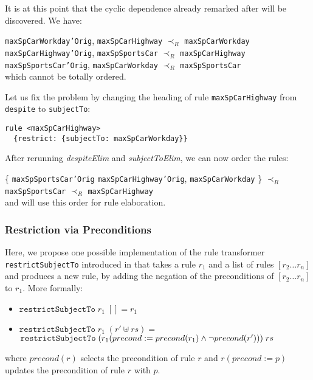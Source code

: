\begin{example}
It is at this point that the cyclic dependence already remarked after
 will be discovered. We have:

\noindent
\texttt{maxSpCarWorkday'Orig}, \texttt{maxSpCarHighway} $\prec_R$ \texttt{maxSpCarWorkday}\\
\texttt{maxSpCarHighway'Orig}, \texttt{maxSpSportsCar} $\prec_R$ \texttt{maxSpCarHighway}\\
\texttt{maxSpSportsCar'Orig}, \texttt{maxSpCarWorkday} $\prec_R$  \texttt{maxSpSportsCar}\\
\noindent
which cannot be totally ordered.

Let us fix the problem by changing the heading of rule
\texttt{maxSpCarHighway} from \texttt{despite} to \texttt{subjectTo}:
\begin{lstlisting}
rule <maxSpCarHighway>
  {restrict: {subjectTo: maxSpCarWorkday}}
\end{lstlisting}

After rerunning \emph{despiteElim} and \emph{subjectToElim}, we can now order
the rules:


\noindent
\{ \texttt{maxSpSportsCar'Orig}
\texttt{maxSpCarHighway'Orig},
\texttt{maxSpCarWorkday} \} $\prec_R$
\texttt{maxSpSportsCar} $\prec_R$
\texttt{maxSpCarHighway}\\
and will use this order for rule elaboration.
\end{example}


\subsubsection{Restriction via Preconditions}\label{sec:restr_precond}

Here, we propose one possible implementation of the rule transformer
\texttt{restrictSubjectTo} introduced in  that takes
a rule $r_1$ and a list of rules $[r_2 \dots r_n]$ and produces a new rule, by
adding the negation of the preconditions of $[r_2 \dots r_n]$ to $r_1$. More
formally:

\begin{itemize}
\item $\mathtt{restrictSubjectTo}\; r_1\; [] = r_1$
\item $\mathtt{restrictSubjectTo}\; r_1\; (r' \uplus rs) =$\\
  $\mathtt{restrictSubjectTo}\; (r_1(precond := precond(r_1) \land \lnot precond(r')))\; rs$
\end{itemize}
where $precond(r)$ selects the precondition of rule $r$ and $r(precond:=p)$
updates the precondition of rule $r$ with $p$.

